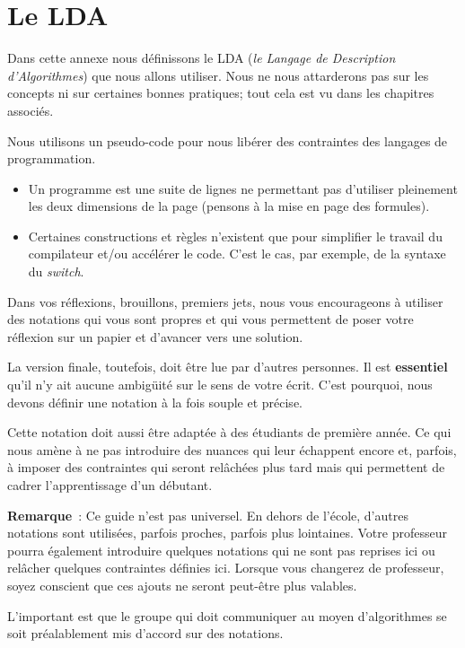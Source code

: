 \chapter{Le LDA}

	Dans cette annexe nous définissons le LDA
	(\emph{le Langage de Description d’Algorithmes})
	que nous allons utiliser. 
	Nous ne nous attarderons pas sur les concepts
	ni sur certaines bonnes pratiques;
	tout cela est vu dans les chapitres associés.
	
	Nous utilisons un pseudo-code pour nous libérer 
	des contraintes des langages de programmation.
	\begin{itemize}
	\item
		Un programme est une suite de lignes
		ne permettant pas d’utiliser pleinement les
		deux dimensions de la page 
		(pensons à la mise en page des formules).
	\item
		Certaines constructions et règles
		n’existent que pour simplifier le travail du compilateur
		et/ou accélérer le code.
		C’est le cas, par exemple, de la syntaxe du \emph{switch}.
	\end{itemize}
	
	Dans vos réflexions, brouillons, premiers jets,
	nous vous encourageons à utiliser des notations
	qui vous sont propres et qui vous permettent
	de poser votre réflexion sur un papier
	et d’avancer vers une solution.
	
	La version finale, toutefois, 
	doit être lue par d’autres personnes.
	Il est \textbf{essentiel} qu’il n’y ait aucune ambigüité
	sur le sens de votre écrit.
	C’est pourquoi, nous devons définir une notation
	à la fois souple et précise.
	
	Cette notation doit aussi être adaptée à des étudiants de première année.
	Ce qui nous amène à ne pas introduire des nuances qui leur échappent encore
	et, parfois, à imposer des contraintes qui seront relâchées plus tard
	mais qui permettent de cadrer l’apprentissage d’un débutant.
	
	\textbf{Remarque}~: Ce guide n’est pas universel.
	En dehors de l’école, d’autres notations sont utilisées,
	parfois proches, parfois plus lointaines.
	Votre professeur pourra également introduire quelques notations
	qui ne sont pas reprises ici 
	ou relâcher quelques contraintes définies ici. 
	Lorsque vous changerez de professeur,
	soyez conscient que ces ajouts ne seront peut-être plus valables.
	
	L’important est que le groupe qui doit communiquer
	au moyen d’algorithmes se soit préalablement mis d’accord 
	sur des notations.

